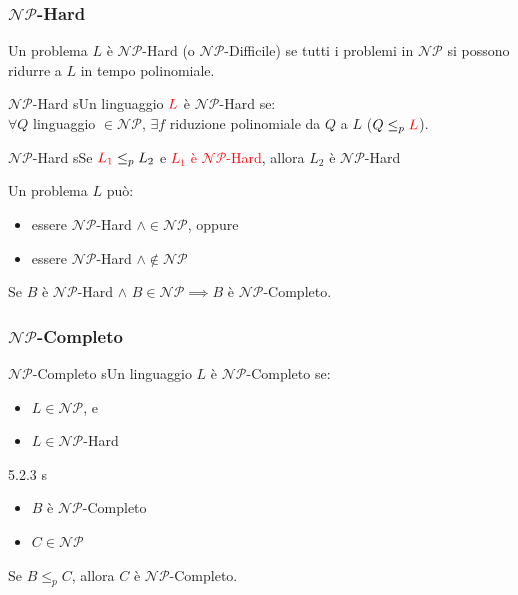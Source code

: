 \documentclass{article}  %
\theoremstyle{definition}
\begin{document}
\subsubsection{$\mathcal{NP}$-Hard}
Un problema $L$ è $\mathcal{NP}$-Hard (o $\mathcal{NP}$-Difficile) se tutti i problemi in $\mathcal{NP}$ si possono ridurre a $L$ in tempo polinomiale.
\begin{theorem}{$\mathcal{NP}$-Hard}
	sUn linguaggio $\textcolor{red}{L}$ è $\mathcal{NP}$-Hard se: \\ $\forall{Q}$ linguaggio $\in \mathcal{NP}$, $\exists f$ riduzione
	polinomiale da $Q$ a $L$ ($Q \leq_p \textcolor{red}{L}$).
\end{theorem}
\begin{theorem}{$\mathcal{NP}$-Hard}
	sSe $\textcolor{red}{L_1} \leq_p L_2$ e \textcolor{red}{$L_1$ è $\mathcal{NP}$-Hard}, allora $L_2$ è $\mathcal{NP}$-Hard
\end{theorem}
Un problema $L$ può:
\begin{itemize}
	\item essere $\mathcal{NP}$-Hard $\land \in \mathcal{NP}$, oppure
	\item essere $\mathcal{NP}$-Hard $\land \notin \mathcal{NP}$
\end{itemize}
Se $B$ è $\mathcal{NP}$-Hard $\land$ $B \in \mathcal{NP} \implies B$ è $\mathcal{NP}$-Completo.
\subsubsection{$\mathcal{NP}$-Completo}
\begin{theorem}{$\mathcal{NP}$-Completo}
	sUn linguaggio $L$ è $\mathcal{NP}$-Completo se:
	\begin{itemize}
		\item $L \in \mathcal{NP}$, e
		\item $L \in \mathcal{NP}$-Hard
	\end{itemize}
\end{theorem}
\begin{theorem}{5.2.3}
	s
	\begin{itemize}
		\item $B$ è $\mathcal{NP}$-Completo
		\item $C \in \mathcal{NP}$
	\end{itemize}
	Se $B \leq_p C$, allora $C$ è $\mathcal{NP}$-Completo.
\end{theorem}


\end{document}
